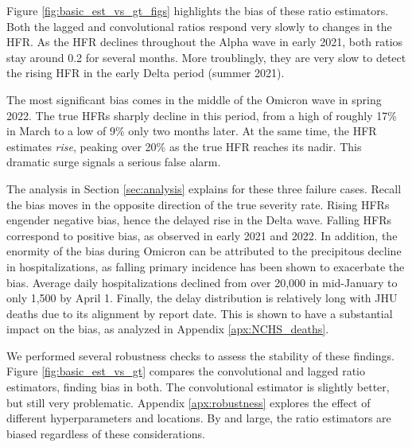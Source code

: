 \documentclass{article}
\newcommand{\ahcomment}[1]{{\color{teal}[AH: #1]}}
\begin{document}
Figure \ref{fig:basic_est_vs_gt_figs} highlights the bias of these ratio estimators. Both the lagged and convolutional ratios respond very slowly to changes in the HFR. As the HFR declines throughout the Alpha wave in early 2021, both ratios stay around 0.2 for several months. More troublingly, they are very slow to detect the rising HFR in the early Delta period (summer 2021). %

The most significant bias comes in the middle of the Omicron wave in spring 2022. The true HFRs sharply decline in this period, from a high of roughly 17\% in March to a low of 9\% only two months later. At the same time, the HFR estimates \textit{rise}, peaking over 20\% as the true HFR reaches its nadir. This dramatic surge signals a serious false alarm. 

The analysis in Section \ref{sec:analysis} explains for these three failure cases. Recall the bias moves in the opposite direction of the true severity rate. Rising HFRs engender negative bias, hence the delayed rise in the Delta wave. Falling HFRs correspond to positive bias, as observed in early 2021 and 2022. In addition, the enormity of the bias during Omicron can be attributed to the precipitous decline in hospitalizations, as falling primary incidence has been shown to exacerbate the bias. Average daily hospitalizations declined from over 20,000 in mid-January to only 1,500 by April 1. Finally, the delay distribution is relatively long with JHU deaths due to its alignment by report date. This is shown to have a substantial impact on the bias, as analyzed in Appendix \ref{apx:NCHS_deaths}.

We performed several robustness checks to assess the stability of these findings. Figure \ref{fig:basic_est_vs_gt} compares the convolutional and lagged ratio estimators, finding bias in both. The convolutional estimator is slightly better, but still very problematic. Appendix \ref{apx:robustness} explores the effect of different hyperparameters and locations. By and large, the ratio estimators are biased regardless of these considerations. 
\end{document}

